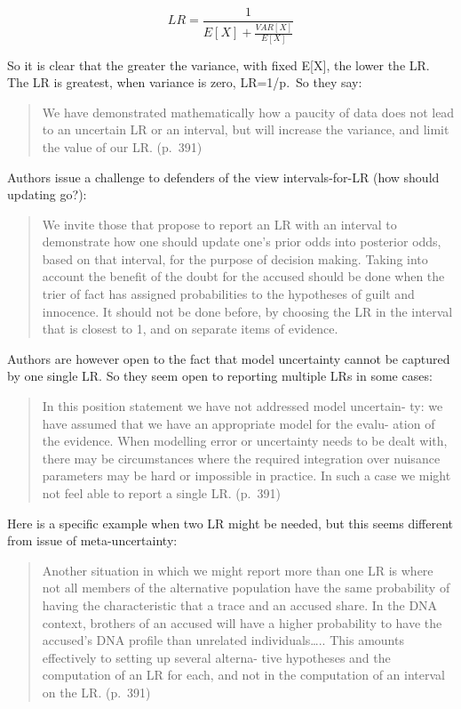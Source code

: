 \documentclass[
  10pt,
  dvipsnames,enabledeprecatedfontcommands]{scrartcl}
\begin{document}
\[LR = \frac{1}{E[X]+\frac{VAR[X]}{E[X]}}\]

\noindent So it is clear that the greater the variance, with fixed
E{[}X{]}, the lower the LR. The LR is greatest, when variance is zero,
LR=1/p.~So they say:

\begin{quote}
We have demonstrated mathematically how a paucity of data does not lead
to an uncertain LR or an interval, but will increase the variance, and
limit the value of our LR. (p.~391)
\end{quote}

\noindent Authors issue a challenge to defenders of the view
intervals-for-LR (how should updating go?):

\begin{quote}
We invite those that propose to report an LR with an interval to
demonstrate how one should update one's prior odds into posterior odds,
based on that interval, for the purpose of decision making. Taking into
account the benefit of the doubt for the accused should be done when the
trier of fact has assigned probabilities to the hypotheses of guilt and
innocence. It should not be done before, by choosing the LR in the
interval that is closest to 1, and on separate items of evidence.
\end{quote}

\noindent Authors are however open to the fact that model uncertainty
cannot be captured by one single LR. So they seem open to reporting
multiple LRs in some cases:

\begin{quote}
In this position statement we have not addressed model uncertain- ty: we
have assumed that we have an appropriate model for the evalu- ation of
the evidence. When modelling error or uncertainty needs to be dealt
with, there may be circumstances where the required integration over
nuisance parameters may be hard or impossible in practice. In such a
case we might not feel able to report a single LR. (p.~391)
\end{quote}

Here is a specific example when two LR might be needed, but this seems
different from issue of meta-uncertainty:

\begin{quote}
Another situation in which we might report more than one LR is where not
all members of the alternative population have the same probability of
having the characteristic that a trace and an accused share. In the DNA
context, brothers of an accused will have a higher probability to have
the accused's DNA profile than unrelated individuals\ldots.. This
amounts effectively to setting up several alterna- tive hypotheses and
the computation of an LR for each, and not in the computation of an
interval on the LR. (p.~391)
\end{quote}
\end{document}
